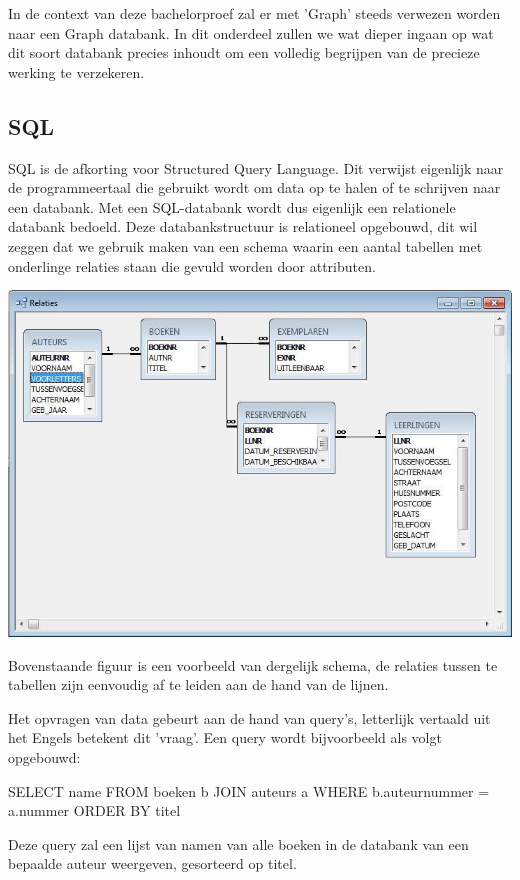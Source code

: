 In de context van deze bachelorproef zal er met 'Graph' steeds verwezen worden naar een Graph databank. In dit onderdeel zullen we wat dieper ingaan op wat dit soort databank precies inhoudt om een volledig begrijpen van de precieze werking te verzekeren. 

\subsection{SQL}
\label{sec:SQL}
SQL is de afkorting voor Structured Query Language. Dit verwijst eigenlijk naar de programmeertaal die gebruikt wordt om data op te halen of te schrijven naar een databank. Met een SQL-databank wordt dus eigenlijk een relationele databank bedoeld. 
Deze databankstructuur is relationeel opgebouwd, dit wil zeggen dat we gebruik maken van een schema waarin een aantal tabellen met onderlinge relaties staan die gevuld worden door attributen. 

	\includegraphics[width=\linewidth]{img/3-0.jpg}
	
Bovenstaande figuur is een voorbeeld van dergelijk schema, de relaties tussen te tabellen zijn eenvoudig af te leiden aan de hand van de lijnen.

Het opvragen van data gebeurt aan de hand van query's, letterlijk vertaald uit het Engels betekent dit 'vraag'. Een query wordt bijvoorbeeld als volgt opgebouwd: 

SELECT name 
FROM boeken b
JOIN auteurs a
WHERE b.auteurnummer = a.nummer
ORDER BY titel

Deze query zal een lijst van namen van alle boeken in de databank van een bepaalde auteur weergeven, gesorteerd op titel.

